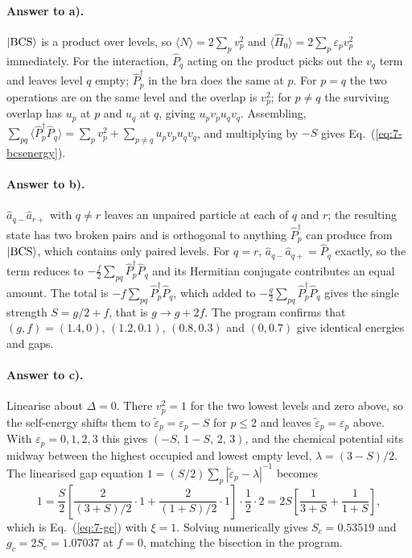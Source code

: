 \paragraph{Answer to a).}
$\vert \mathrm{BCS} \rangle$ is a product over levels, so
$\langle\hat{N}\rangle=2\sum_p v_p^2$ and
$\langle\hat{H}_0\rangle=2\sum_p\varepsilon_p v_p^2$ immediately.  For the
interaction, $\hat{P}_q$ acting on the product picks out the $v_q$ term and
leaves level $q$ empty; $\hat{P}^{\dagger}_p$ in the bra does the same at $p$.
For $p=q$ the two operations are on the same level and the overlap is
$v_p^2$; for $p\ne q$ the surviving overlap has $u_p$ at $p$ and $u_q$ at $q$,
giving $u_pv_pu_qv_q$.  Assembling,
$\sum_{pq}\langle\hat{P}^{\dagger}_p\hat{P}_q\rangle
=\sum_p v_p^2+\sum_{p\ne q}u_pv_pu_qv_q$, and multiplying by $-S$ gives
Eq.~(\ref{eq:7-bcsenergy}).

\paragraph{Answer to b).}
$\hat{a}_{q-}\hat{a}_{r+}$ with $q\ne r$ leaves an unpaired particle at each
of $q$ and $r$; the resulting state has two broken pairs and is orthogonal to
anything $\hat{P}^{\dagger}_p$ can produce from
$\vert \mathrm{BCS} \rangle$, which contains only paired levels.  For $q=r$,
$\hat{a}_{q-}\hat{a}_{q+}=\hat{P}_q$ exactly, so the term reduces to
$-\tfrac{f}{2}\sum_{pq}\hat{P}^{\dagger}_p\hat{P}_q$ and its Hermitian
conjugate contributes an equal amount.  The total is
$-f\sum_{pq}\hat{P}^{\dagger}_p\hat{P}_q$, which added to
$-\tfrac{g}{2}\sum_{pq}\hat{P}^{\dagger}_p\hat{P}_q$ gives the single
strength $S=g/2+f$, that is $g\to g+2f$.  The program confirms that
$(g,f)=(1.4,0)$, $(1.2,0.1)$, $(0.8,0.3)$ and $(0,0.7)$ give identical
energies and gaps.

\paragraph{Answer to c).}
Linearise about $\Delta=0$.  There $v_p^2=1$ for the two lowest levels and
zero above, so the self-energy shifts them to
$\tilde{\varepsilon}_p=\varepsilon_p-S$ for $p\le2$ and leaves
$\tilde{\varepsilon}_p=\varepsilon_p$ above.  With $\varepsilon_p=0,1,2,3$
this gives $(-S,\,1-S,\,2,\,3)$, and the chemical potential sits midway
between the highest occupied and lowest empty level,
$\lambda=(3-S)/2$.  The linearised gap equation
$1=(S/2)\sum_p|\tilde{\varepsilon}_p-\lambda|^{-1}$ becomes
\begin{equation}
  1 = \frac{S}{2}\left[\frac{2}{(3+S)/2}\cdot 1
    + \frac{2}{(1+S)/2}\cdot 1\right]\cdot\frac12\cdot 2
   = 2S\left[\frac{1}{3+S}+\frac{1}{1+S}\right],
  \label{eq:7-exc4}
\end{equation}
which is Eq.~(\ref{eq:7-gc}) with $\xi=1$.  Solving numerically gives
$S_c=0.53519$ and $g_c=2S_c=1.07037$ at $f=0$, matching the bisection in the
program.

